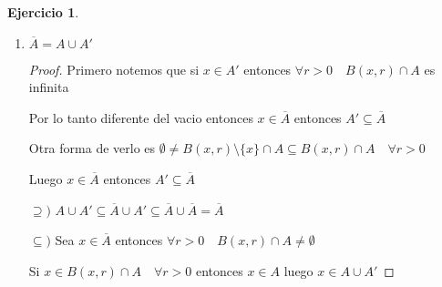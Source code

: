 \documentclass[11pt]{report}
\newcommand{\ol}{\overline}
\theoremstyle{definition}
\newtheorem{ej}{Ejercicio}
\begin{document}
\begin{ej}
\begin{enumerate}
\begin{enumerate}
\begin{proof}
	    Sin usar sucesiones:

	    $\subseteq$) Sea $x \in (A \cup B) '$. Entonces: 

	    $$\emptyset \neq (B(x,r)\setminus\{x\}) \cap (A \cup B) = ((B(x,r)\setminus \{x\}) \cap A) \cup ((B(x,r)\setminus\{x\}) \cap B)$$

	    Entonces para cada radio $r$ sucede $B(x,r)\setminus\{x\} \cap A \neq \emptyset$ o $B(x,r)\setminus\{x\} \cap B \neq \emptyset $
 
            Supongamos que $x \notin A'\cup B'$ entonces $x \notin A'$ y $x \notin B'$ 

	    Luego $\exists r_1>0$ tal que $(B(x,r_1)\setminus\{x\}) \cap A = \emptyset$ 

	    También $\exists r_2>0$ tal que $(B(x,r_2) \setminus\{x\} )\cap B = \emptyset$

	    Tomamos $r = min \{r_1,r_2\}$ 

	    Entonces $(B(x,r)\setminus \{x\} \cap A = \emptyset)$ y también $ (B(x,r)\setminus \{x\} \cap B = \emptyset)   $

	    Lo que es absurdo, por lo tanto $x \in A'\cup B'$

	  $\supseteq )$ Sea $x \in A'\cup B'$ entonces spd $x \in A'$ por lo tanto $B(x,r)\setminus\{x\} \cap A \neq \emptyset \quad \forall r>0$

	  Pero entonces $B(x,r)\setminus\{x\}\cap (A \cup B) \neq \emptyset\quad \forall r>0$ por lo tanto $x \in (A\cup B)'$
	  \end{proof}
	\item $\ol A = A \cup A'$
	  \begin{proof}
	  Primero notemos que si $x \in A'$ entonces $\forall r > 0 \quad  B(x,r) \cap A$ es infinita 

	 Por lo tanto diferente del vacio entonces $x \in \ol A$ entonces $A' \subseteq \ol A$

	 Otra forma de verlo es $\emptyset \neq B(x,r)\setminus\{x\} \cap A \subseteq B(x,r) \cap A \quad \forall r>0$

	 Luego $x \in \ol A$ entonces $A'\subseteq \ol A$

	  $\supseteq )$ $ A \cup A' \subseteq \ol A \cup A' \subseteq \ol A \cup \ol A= \ol A$

	$\subseteq )$ Sea $x \in \ol A$ entonces $\forall r>0 \quad  B(x,r) \cap A \neq \emptyset$

	Si $x \in B(x,r) \cap A \quad \forall r >0$ entonces $x \in A$ luego $x \in A\cup A'$


\end{proof}
\end{enumerate}
\end{enumerate}
\end{ej}
\end{document}
